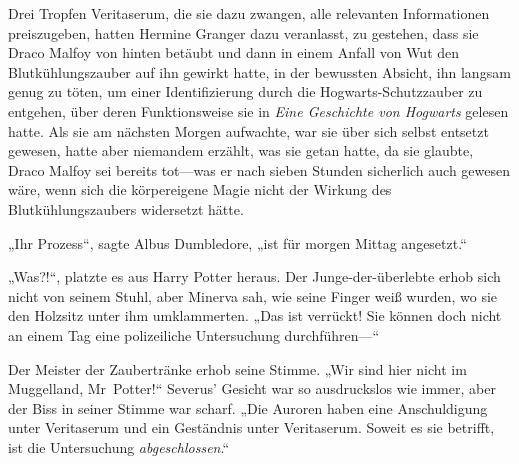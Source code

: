 Drei Tropfen Veritaserum, die sie dazu zwangen, alle relevanten Informationen preiszugeben, hatten Hermine Granger dazu veranlasst, zu gestehen, dass sie Draco Malfoy von hinten betäubt und dann in einem Anfall von Wut den Blutkühlungszauber auf ihn gewirkt hatte, in der bewussten Absicht, ihn langsam genug zu töten, um einer Identifizierung durch die Hogwarts-Schutzzauber zu entgehen, über deren Funktionsweise sie in \emph{Eine Geschichte von Hogwarts} gelesen hatte. Als sie am nächsten Morgen aufwachte, war sie über sich selbst entsetzt gewesen, hatte aber niemandem erzählt, was sie getan hatte, da sie glaubte, Draco Malfoy sei bereits tot—was er nach sieben Stunden sicherlich auch gewesen wäre, wenn sich die körpereigene Magie nicht der Wirkung des Blutkühlungszaubers widersetzt hätte.

„Ihr Prozess“, sagte Albus Dumbledore, „ist für morgen Mittag angesetzt.“

„Was?!“, platzte es aus Harry Potter heraus.
Der Junge-der-überlebte erhob sich nicht von seinem Stuhl, aber Minerva sah, wie seine Finger weiß wurden, wo sie den Holzsitz unter ihm umklammerten.
„Das ist verrückt! Sie können doch nicht an einem Tag eine polizeiliche Untersuchung durchführen—“

Der Meister der Zaubertränke erhob seine Stimme.
„Wir sind hier nicht im Muggelland, Mr~Potter!“
Severus' Gesicht war so ausdruckslos wie immer, aber der Biss in seiner Stimme war scharf.
„Die Auroren haben eine Anschuldigung unter Veritaserum und ein Geständnis unter Veritaserum. Soweit es sie betrifft, ist die Untersuchung \emph{abgeschlossen}.“


